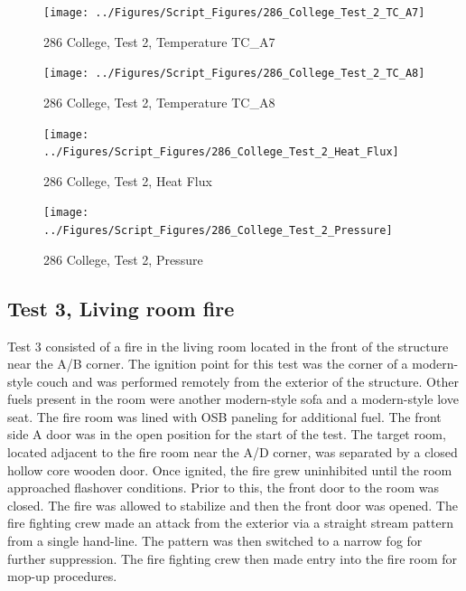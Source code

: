 \documentclass[12pt,oneside]{book}
\begin{document}
\begin{figure}[!ht]
\texttt{[image: ../Figures/Script\_Figures/286\_College\_Test\_2\_TC\_A7]}
\caption{286 College, Test 2, Temperature TC\_A7}
\label{fig:286_College_Test_2_TC_A7}
\end{figure}

\begin{figure}[!ht]
\texttt{[image: ../Figures/Script\_Figures/286\_College\_Test\_2\_TC\_A8]}
\caption{286 College, Test 2, Temperature TC\_A8}
\label{fig:286_College_Test_2_TC_A8}
\end{figure}

\begin{figure}[!ht]
\texttt{[image: ../Figures/Script\_Figures/286\_College\_Test\_2\_Heat\_Flux]}
\caption{286 College, Test 2, Heat Flux}
\label{fig:286_College_Test_2_Heat_Flux}
\end{figure}

\begin{figure}[!ht]
\texttt{[image: ../Figures/Script\_Figures/286\_College\_Test\_2\_Pressure]}
\caption{286 College, Test 2, Pressure}
\label{fig:286_College_Test_2_Pressure}
\end{figure}


\clearpage


\subsection{Test 3, Living room fire}

Test 3 consisted of a fire in the living room located in the front of the structure near the A/B corner. The ignition point for this test was the corner of a modern-style couch and was performed remotely from the exterior of the structure. Other fuels present in the room were another modern-style sofa and a modern-style love seat. The fire room was lined with OSB paneling for additional fuel. The front side A door was in the open position for the start of the test. The target room, located adjacent to the fire room near the A/D corner, was separated by a closed hollow core wooden door. Once ignited, the fire grew uninhibited until the room approached flashover conditions. Prior to this, the front door to the room was closed. The fire was allowed to stabilize and then the front door was opened. The fire fighting crew made an attack from the exterior via a straight stream pattern from a single hand-line. The pattern was then switched to a narrow fog for further suppression. The fire fighting crew then made entry into the fire room for mop-up procedures.
\end{document}
